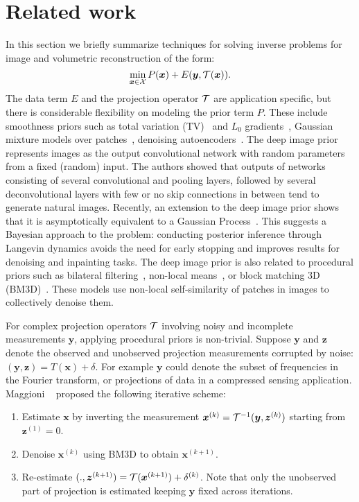 \section{Related work}
\label{dsp:related}

In this section we briefly summarize techniques for solving inverse problems for image and volumetric reconstruction of the form:
\begin{equation}
\label{eqn:inverse-problems}
\min_{\bm{x} \in {\cal X}} P(\bm{x}) + E(\bm{y}, {\cal T}(\bm{x})).
\end{equation}
The data term $E$ and the projection operator ${\cal T}$ are application specific, but there is considerable flexibility on modeling the prior term $P$. These include smoothness priors such as total variation (TV)~\cite{rudin1992nonlinear} and $L_0$ gradients~\cite{xu2011image}, Gaussian mixture models over patches~\cite{zoran2011learning}, denoising autoencoders~\cite{vincent2010stacked}.
The deep image prior~\cite{ulyanov17deep} represents images as the output convolutional network with random parameters from a fixed (random) input.
The authors showed that outputs of networks consisting of several convolutional and pooling layers, followed by several deconvolutional layers with few or no skip connections in between tend to generate natural images.
Recently, an extension to the deep image prior shows that it is asymptotically equivalent to a Gaussian Process~\cite{bayesiandip}.
This suggests a Bayesian approach to the problem: conducting posterior inference through Langevin dynamics avoids the need for early
stopping and improves results for denoising and inpainting tasks.
The deep image prior is also related to procedural priors such as bilateral filtering~\cite{tomasi1998bilateral}, non-local means~\cite{buades2005non}, or block matching 3D (BM3D)~\cite{dabov2007image}.
These models use non-local self-similarity of patches in images to collectively denoise them.


For complex projection operators ${\cal T}$ involving noisy and incomplete measurements $\bm{y}$, applying procedural priors is non-trivial. 
Suppose $\bm{y}$ and $\bm{z}$ denote the observed and unobserved projection measurements corrupted by noise: $(\bm{y},\bm{z}) = T(\bm{x}) + \delta$. For example $\bm{y}$ could denote the subset of frequencies in the Fourier transform, or projections of data in a compressed sensing application. Maggioni \etal~\cite{maggioni2013nonlocal} proposed the following iterative scheme: 
\begin{enumerate}
\item Estimate $\bm{x}$ by inverting the measurement $\bm{x}^{(k)}={\cal T}^{-1}(\bm{y}, \bm{z}^{(k)})$ starting from $\bm{z}^{(1)}=0$.
\item Denoise $\bm{x}^{(k)}$ using BM3D to obtain $\bm{x}^{(k+1)}$.
\item Re-estimate $(., \bm{z}^{(k+1)}) = {\cal T}(\bm{x}^{(k+1)}) + \delta^{(k)}$. Note that only the unobserved part of projection is estimated keeping $\bm{y}$ fixed across iterations.
\end{enumerate}

